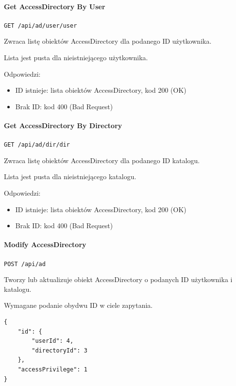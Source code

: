 \documentclass[a4paper,twoside,12pt]{book}
\begin{document}
\paragraph{Get AccessDirectory By User}\label{get-accessdirectory-by-user}

\texttt{GET /api/ad/user/{user}}

Zwraca listę obiektów AccessDirectory dla podanego ID użytkownika.

Lista jest pusta dla nieistniejącego użytkownika.

Odpowiedzi: 
\begin{itemize}
	\item ID istnieje: lista obiektów AccessDirectory, kod 200 (OK)
	\item Brak ID: kod 400 (Bad Request)
\end{itemize}

\paragraph{Get AccessDirectory By Directory}\label{get-accessdirectory-by-directory}

\texttt{GET /api/ad/dir/{dir}}

Zwraca listę obiektów AccessDirectory dla podanego ID katalogu.

Lista jest pusta dla nieistniejącego katalogu.

Odpowiedzi: 
\begin{itemize}
	\item ID istnieje: lista obiektów AccessDirectory, kod 200 (OK)
	\item Brak ID: kod 400 (Bad Request)
\end{itemize}

\paragraph{Modify AccessDirectory}\label{modify-accessdirectory}

\texttt{POST /api/ad}

Tworzy lub aktualizuje obiekt AccessDirectory o podanych ID użytkownika i katalogu.

Wymagane podanie obydwu ID w ciele zapytania.

\begin{verbatim}
{
    "id": {
        "userId": 4,
        "directoryId": 3
    },
    "accessPrivilege": 1
}
\end{verbatim}
\end{document}
